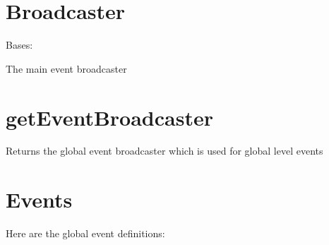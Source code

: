 \documentclass[letterpaper,10pt,english]{sphinxmanual}
\begin{document}
\section{Broadcaster}
\label{events:broadcaster}

\begin{fulllineitems}
\label{events:serge.events.Broadcaster}
Bases: {\hyperref[common:serge.common.EventAware]{}}

The main event broadcaster

\end{fulllineitems}



\section{getEventBroadcaster}
\label{events:geteventbroadcaster}

\begin{fulllineitems}
\label{events:events.getEventBroadcaster}
Returns the global event broadcaster which is used for global level events

\end{fulllineitems}



\section{Events}
\label{events:id1}
Here are the global event definitions:
\end{document}
